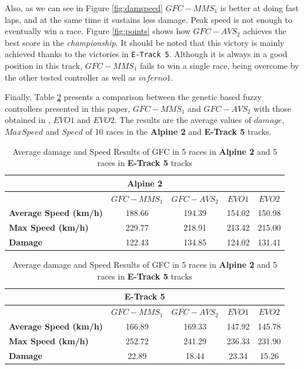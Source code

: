 \documentclass[conference]{IEEEtran}
\begin{document}
Also, as we can see in Figure \ref{fig:damspeed} $GFC-MMS_1$ is better at doing fast laps, and at the same time it sustains less damage. Peak speed is not
enough to eventually win a race. Figure \ref{fig:points} shows how
$GFC-AVS_2$ achieves the best score in the {\em championship}. It
should be noted that this victory is mainly achieved thanks to the 
victories in {\tt E-Track 5}. Although it is always in a good position
in this track, $GFC-MMS_1$ fails to win a single race, being overcome
by the other tested controller as well as $inferno1$.

Finally, Table \ref{tab:damagespeed} presents a comparison between the genetic based fuzzy controllers presented in this paper, \textbf{$GFC-MMS_1$} and \textbf{$GFC-AVS_2$} with those obtained in \cite{evo18}, $EVO1$  and $EVO2$. The results are the average values of $damage$, $MaxSpeed$ and $Speed$ of 10 races in the \textbf{Alpine 2} and \textbf{E-Track 5} tracks. 

\begin{table}[!ht]
  \centering
  {\scriptsize
    \caption{Average damage and Speed Results of GFC in 5 races in \textbf{Alpine 2} and 5 races in \textbf{E-Track 5} tracks}
    \label{tab:damagespeed}
    \begin{tabular}{|p{1.65cm}|c|c|c|c|}
      \hline 
      \multicolumn{5}{|c|}{\textbf{Alpine 2}}  \\	
      \hline  
   & \textbf{$GFC-MMS_1$}&\textbf{$GFC-AVS_2$} & \textbf{$EVO1$} &\textbf{$EVO2$}\\					
      \hline \textbf{Average Speed (km/h)}& 188.66&194.39&154.02&150.98\\
      \hline \textbf{Max Speed (km/h)}& 229.77&218.91&213.42&215.00\\	
      \hline \textbf{Damage}& 122.43& 134.85&124.02 &131.41\\	
      \hline 
    \end{tabular}
    \begin{tabular}{|p{1.65cm}|c|c|c|c|}
      \multicolumn{5}{|c|}{\textbf{E-Track 5}}  \\
      \hline 
   & \textbf{$GFC-MMS_1$}&\textbf{$GFC-AVS_2$} & \textbf{$EVO1$} &\textbf{$EVO2$} \\				
      \hline \textbf{Average Speed (km/h)}& 166.89&169.33&147.92&145.78\\
      \hline \textbf{Max Speed  (km/h)}&252.72&241.29&236.33&231.90\\	
      \hline \textbf{Damage}& 22.89& 18.44&23.34 &15.26\\	
      \hline 
    \end{tabular}
	}
\end{table} 
\end{document}
